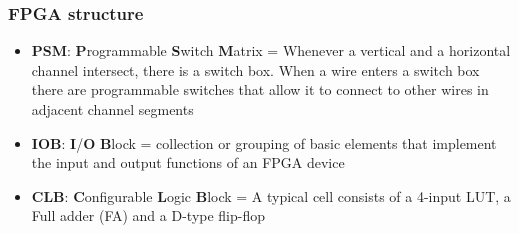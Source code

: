 \documentclass[aspectratio=169]{beamer}
\begin{document}
	\begin{frame}[noframenumbering]
		\frametitle{FPGA structure}
		\begin{itemize}
			\item \textbf{PSM}: \textbf{P}rogrammable \textbf{S}witch \textbf{M}atrix = Whenever a vertical and a horizontal channel intersect, there is a switch box. When a wire enters a switch box there are programmable switches that allow it to connect to other wires in adjacent channel segments
			\item \textbf{IOB}: \textbf{I}/\textbf{O} \textbf{B}lock = collection or grouping of basic elements that implement the input and output functions of an FPGA device
			\item \textbf{CLB}: \textbf{C}onfigurable \textbf{L}ogic \textbf{B}lock = A typical cell consists of a 4-input LUT, a Full adder (FA) and a D-type flip-flop
		\end{itemize}
	\end{frame}
	
\end{document}
